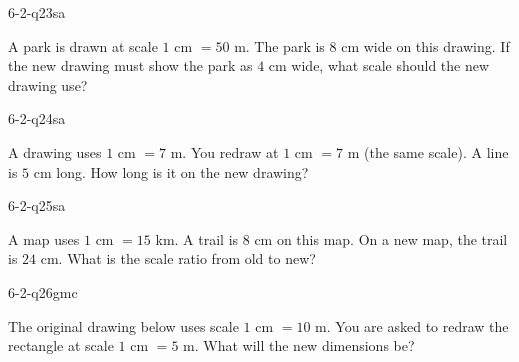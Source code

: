 \begin{practiceQuestion}{6-2-q23}{sa}
\begin{questionText}
A park is drawn at scale $1$ cm $= 50$ m. The park is $8$ cm wide on this drawing. If the new drawing must show the park as $4$ cm wide, what scale should the new drawing use?
\end{questionText}
\end{practiceQuestion}

\begin{practiceQuestion}{6-2-q24}{sa}
\begin{questionText}
A drawing uses $1$ cm $= 7$ m. You redraw at $1$ cm $= 7$ m (the same scale). A line is $5$ cm long. How long is it on the new drawing?
\end{questionText}
\end{practiceQuestion}

\begin{practiceQuestion}{6-2-q25}{sa}
\begin{questionText}
A map uses $1$ cm $= 15$ km. A trail is $8$ cm on this map. On a new map, the trail is $24$ cm. What is the scale ratio from old to new?
\end{questionText}
\end{practiceQuestion}


\begin{practiceQuestion}{6-2-q26}{gmc}
\begin{questionText}
The original drawing below uses scale $1$ cm $= 10$ m. You are asked to redraw the rectangle at scale $1$ cm $= 5$ m. What will the new dimensions be?

\begin{center}
\end{center}
\end{questionText}
\end{practiceQuestion}

